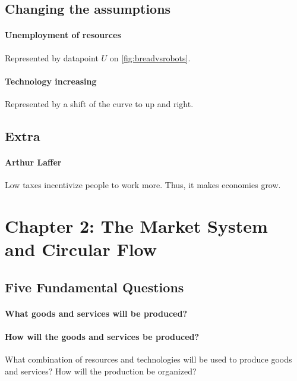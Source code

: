 
\subsection{Changing the assumptions}

\paragraph{Unemployment of resources} Represented by datapoint $U$ on \cref{fig:breadvsrobots}.

\paragraph{Technology increasing} Represented by a shift of the curve to up and right.

\subsection{Extra}

\paragraph{Arthur Laffer} Low taxes incentivize people to work more. Thus, it makes economies grow.

\newpage
\section{Chapter 2: The Market System and Circular Flow}

\subsection{Five Fundamental Questions}

\paragraph{What goods and services will be produced?} 

\paragraph{How will the goods and services be produced?} What combination of resources and technologies will be used to produce goods and services? How will the production be organized?

